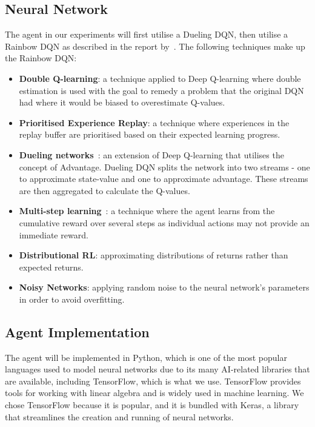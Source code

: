 \documentclass[12pt,a4paper]{article}
\begin{document}
    \subsection{Neural Network}\label{subsec:neural-network}
    The agent in our experiments will first utilise a Dueling DQN, then utilise a Rainbow DQN as described in the report by~\citet{hessel17}.
    The following techniques make up the Rainbow DQN:
    \begin{itemize}
        \item \textbf{Double Q-learning}: a technique applied to Deep Q-learning where double estimation is used
        with the goal to remedy a problem that the original DQN had where it would be biased to overestimate Q-values.
        \item \textbf{Prioritised Experience Replay}: a technique where experiences in the replay buffer are
        prioritised based on their expected learning progress.
        \item \textbf{Dueling networks}~\citep{schaul16}: an extension of Deep Q-learning that utilises the concept of Advantage.
        Dueling DQN splits the network into two streams - one to approximate state-value and one to approximate advantage.
        These streams are then aggregated to calculate the Q-values.
        \item \textbf{Multi-step learning}~\citep[chap.~7.1]{sutton18}: a technique where the agent learns from the cumulative reward over several steps as individual actions may not provide an immediate reward.
        \item \textbf{Distributional RL}: approximating distributions of returns rather than expected returns.
        \item \textbf{Noisy Networks}: applying random noise to the neural network's parameters in order to avoid overfitting.
    \end{itemize}

    \subsection{Agent Implementation}\label{subsec:implementation}
    The agent will be implemented in Python, which is one of the most popular languages used to model neural networks due to its many AI-related libraries that are available, including TensorFlow, which is what we use.
    TensorFlow provides tools for working with linear algebra and is widely used in machine learning.
    We chose TensorFlow because it is popular, and it is bundled with Keras, a library that streamlines the creation and running of neural networks.
\end{document}
